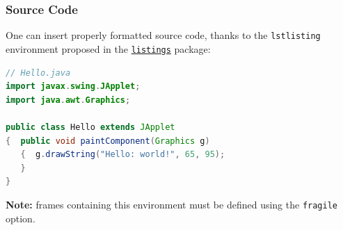 \documentclass[10pt,    %
    english,            %
    xcolor=table,       %
    envcountsect,       %
    aspectratio=43      %
]{beamer}
\begin{document}
\begin{frame}[fragile]
    \frametitle{Source Code}
    \label{frm:sourcecode}
    
    One can insert properly formatted source code, thanks to the \texttt{lstlisting} environment proposed in the \href{https://ctan.org/pkg/listings?lang=en}{\texttt{listings}} package:
    
    \begin{lstlisting}[language=Java,caption={Hello World Java applet.},captionpos=b,label={lst:hello}]
// Hello.java
import javax.swing.JApplet;
import java.awt.Graphics;

public class Hello extends JApplet
{  public void paintComponent(Graphics g) 
   {  g.drawString("Hello: world!", 65, 95);
   }    
}
    \end{lstlisting}
    
    \vspace{0.25cm}
    \textbf{Note:} frames containing this environment must be defined using the \texttt{fragile} option.
    
    
\end{frame}
\end{document}
